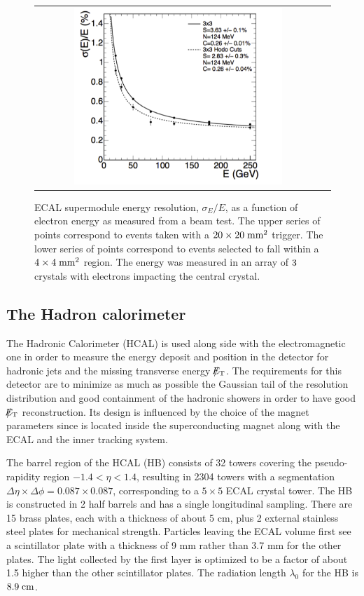 \begin{figure}[tbh!]
	\centering
	\begin{tabular}{cc}
		\includegraphics[width=0.75\textwidth]{detector/pics/ECAL_resolution.pdf}
	\end{tabular}
	\caption{ECAL supermodule energy resolution, $\sigma_{E}/E$, as a function of electron energy as measured from a beam test. The upper series of points correspond to events taken with a $20\times20\;\text{mm}^{2}$ trigger. The lower series of points correspond to events selected to fall within a $4\times4\;\text{mm}^{2}$ region. The energy was measured in an array of $3\time3$ crystals with electrons impacting the central crystal.}
	\label{fig:ECAL_resolution}
\end{figure}

\clearpage

\subsection{The Hadron calorimeter}

The Hadronic Calorimeter (HCAL) is used along side with the electromagnetic one in order to measure the energy deposit and position in the detector for hadronic jets and the missing transverse energy $\slash\mkern-12mu{E}_{\text{T}}$. The requirements for this detector are to minimize as much as possible the Gaussian tail of the resolution distribution and good containment of the hadronic showers in order to have good $\slash\mkern-12mu{E}_{\text{T}}$ reconstruction. Its design is influenced by the choice of the magnet parameters since is located inside the superconducting magnet along with the ECAL and the inner tracking system. 

The barrel region of the HCAL (HB) consists of 32 towers covering the pseudo-rapidity region $-1.4 < \eta < 1.4$, resulting in 2304 towers with a segmentation $\Delta\eta\times\Delta\phi = 0.087\times0.087$, corresponding to a $5\times5$ ECAL crystal tower. The HB is constructed in 2 half barrels and has a single longitudinal sampling. There are 15 brass plates, each with a thickness of about 5 cm, plus 2 external stainless steel plates for mechanical strength. Particles leaving the ECAL volume first see a scintillator plate with a thickness of 9 mm rather than 3.7 mm for the other plates. The light collected by the first layer is optimized to be a factor of about 1.5 higher than the other scintillator plates. The radiation length $\lambda_{0}$ for the HB is $8.9\;\text{cm}$.

